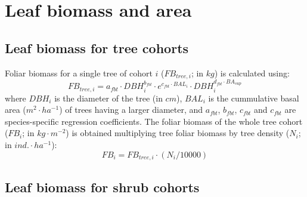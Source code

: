 \documentclass[]{book}
\begin{document}
\hypertarget{leaf-biomass-and-area}{%
\section{Leaf biomass and area}\label{leaf-biomass-and-area}}

\hypertarget{leaf-biomass-for-tree-cohorts}{%
\subsection{Leaf biomass for tree cohorts}\label{leaf-biomass-for-tree-cohorts}}

Foliar biomass for a single tree of cohort \(i\) (\(FB_{tree,i}\); in \(kg\)) is calculated using:
\begin{equation}
FB_{tree,i} = a_{fbt} \cdot DBH_{i}^{b_{fbt}}\cdot e^{c_{fbt}\cdot BAL_i} \cdot DBH_{i}^{d_{fbt} \cdot BA_{sup}}
\label{eq:onetreefoliarbiomass}
\end{equation}
where \(DBH_{i}\) is the diameter of the tree (in \(cm\)), \(BAL_i\) is the cummulative basal area (\(m^2\cdot ha^{-1}\)) of trees having a larger diameter, and \(a_{fbt}\), \(b_{fbt}\), \(c_{fbt}\) and \(c_{fbt}\) are species-specific regression coefficients. The foliar biomass of the whole tree cohort (\(FB_{i}\); in \(kg\cdot m^{-2}\)) is obtained multiplying tree foliar biomass by tree density (\(N_{i}\); in \(ind.\cdot ha^{-1}\)):
\begin{equation}
FB_{i} = FB_{tree,i}\cdot (N_{i}/10000)
\label{eq:treefoliarbiomass}
\end{equation}

\hypertarget{leaf-biomass-for-shrub-cohorts}{%
\subsection{Leaf biomass for shrub cohorts}\label{leaf-biomass-for-shrub-cohorts}}
\end{document}

